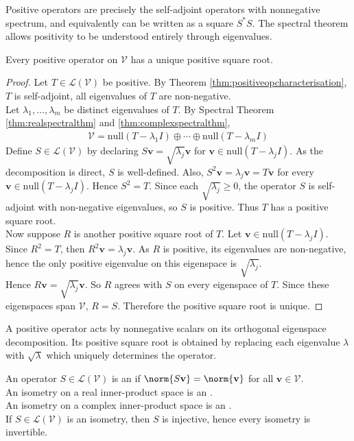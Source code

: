 Positive operators are precisely the self-adjoint operators with nonnegative spectrum, and equivalently can be written as a square $S^* S$. The spectral theorem allows positivity to be understood entirely through eigenvalues.

\begin{proposition} Every positive operator on $\mathcal{V}$ has a unique positive square root.
\begin{proof} Let $T \in \mathcal{L}(\mathcal{V})$ be positive. By Theorem \ref{thm:positiveopcharacterisation}, $T$ is self-adjoint, all eigenvalues of $T$ are non-negative.\\
Let $\lambda_1, \ldots, \lambda_m$ be distinct eigenvalues of $T$. By Spectral Theorem \ref{thm:realspectralthm} and \ref{thm:complexspectralthm},
\begin{align}
\mathcal{V} = \text{null}(T - \lambda_1 I) \oplus \cdots \oplus \text{null}(T - \lambda_m I) \nonumber
\end{align}
Define $S \in \mathcal{L}(\mathcal{V})$ by declaring $S\mathbf{v} = \sqrt{\lambda_j} \mathbf{v}$ for $\mathbf{v} \in \text{null}(T - \lambda_j I)$. As the decomposition is direct, $S$ is well-defined. Also, $S^2 \mathbf{v} = \lambda_j \mathbf{v} = T \mathbf{v}$ for every $\mathbf{v} \in \text{null}(T - \lambda_j I)$. Hence $S^2 = T$. Since each $\sqrt{\lambda_j} \geq 0$, the operator $S$ is self-adjoint with non-negative eigenvalues, so $S$ is positive. Thus $T$ has a positive square root.\\
Now suppose $R$ is another positive square root of $T$. Let $\mathbf{v} \in \text{null}(T - \lambda_j I)$. Since $R^2 = T$, then $R^2 \mathbf{v} = \lambda_j \mathbf{v}$. As $R$ is positive, its eigenvalues are non-negative, hence the only positive eigenvalue on this eigenspace is $\sqrt{\lambda_j}$.\\
Hence $R \mathbf{v} = \sqrt{\lambda_j} \mathbf{v}$. So $R$ agrees with $S$ on every eigenspace of $T$. Since these eigenspaces span $\mathcal{V}$, $R = S$. Therefore the positive square root is unique.
\end{proof}
\end{proposition}

A positive operator acts by nonnegative scalars on its orthogonal eigenspace decomposition. Its positive square root is obtained by replacing each eigenvalue $\lambda$ with $\sqrt{\lambda}$ which uniquely determines the operator.

\begin{definition} An operator $S \in \mathcal{L}(\mathcal{V})$ is an  if $\norm{S \mathbf{v}} = \norm{\mathbf{v}}$ for all $\mathbf{v} \in \mathcal{V}$.\\
An isometry on a real inner-product space is an .\\
An isometry on a complex inner-product space is an .\\
If $S \in \mathcal{L}(\mathcal{V})$ is an isometry, then $S$ is injective, hence every isometry is invertible. 
\end{definition}

